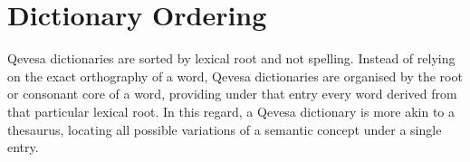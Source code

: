 \documentclass[grammar]{subfiles}
\begin{document}

%
%
%
%

  \section{Dictionary Ordering}
  \label{sec:mt_dictionary_ordering}

  Qevesa dictionaries are sorted by lexical root and not spelling.  Instead of
  relying on the exact orthography of a word, Qevesa dictionaries are organised
  by the root or consonant core of a word, providing under that entry every
  word derived from that particular lexical root.  In this regard, a Qevesa
  dictionary is more akin to a thesaurus, locating all possible variations of a
  semantic concept under a single entry.
\end{document}
